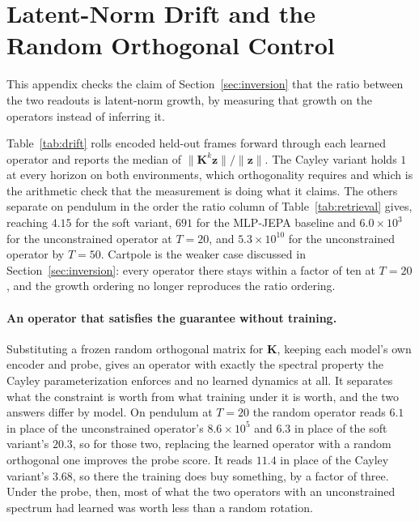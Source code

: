 \documentclass[10pt]{article} %
\newcommand{\K}{\mathbf{K}}
\newcommand{\z}{\bm{z}}
\begin{document}
\section{Latent-Norm Drift and the Random Orthogonal Control}
\label{app:drift}
This appendix checks the claim of Section~\ref{sec:inversion} that the ratio between the two readouts is latent-norm growth, by measuring that growth on the operators instead of inferring it.



Table~\ref{tab:drift} rolls encoded held-out frames forward through each learned operator and reports the median of $\|\K^k\z\| / \|\z\|$. The Cayley variant holds $1$ at every horizon on both environments, which orthogonality requires and which is the arithmetic check that the measurement is doing what it claims. The others separate on pendulum in the order the ratio column of Table~\ref{tab:retrieval} gives, reaching $4.15$ for the soft variant, $691$ for the MLP-JEPA baseline and $6.0\times10^{3}$ for the unconstrained operator at $T{=}20$, and $5.3\times10^{10}$ for the unconstrained operator by $T{=}50$. Cartpole is the weaker case discussed in Section~\ref{sec:inversion}: every operator there stays within a factor of ten at $T{=}20$, and the growth ordering no longer reproduces the ratio ordering.

\paragraph{An operator that satisfies the guarantee without training.}
Substituting a frozen random orthogonal matrix for $\K$, keeping each model's own encoder and probe, gives an operator with exactly the spectral property the Cayley parameterization enforces and no learned dynamics at all. It separates what the constraint is worth from what training under it is worth, and the two answers differ by model. On pendulum at $T{=}20$ the random operator reads $6.1$ in place of the unconstrained operator's $8.6\times10^{5}$ and $6.3$ in place of the soft variant's $20.3$, so for those two, replacing the learned operator with a random orthogonal one improves the probe score. It reads $11.4$ in place of the Cayley variant's $3.68$, so there the training does buy something, by a factor of three. Under the probe, then, most of what the two operators with an unconstrained spectrum had learned was worth less than a random rotation.
\end{document}

